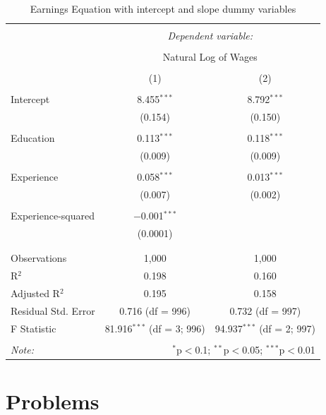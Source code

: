 \documentclass[
]{book}
\theoremstyle{definition}
\theoremstyle{definition}
\theoremstyle{definition}
\theoremstyle{definition}
\theoremstyle{remark}
\begin{document}
\begin{table}[!htbp] \centering 
  \caption{Earnings Equation  with intercept and slope dummy variables} 
  \label{} 
\begin{tabular}{@{\extracolsep{5pt}}lcc} 
\\[-1.8ex]\hline 
\hline \\[-1.8ex] 
 & \multicolumn{2}{c}{\textit{Dependent variable:}} \\ 
\cline{2-3} 
\\[-1.8ex] & \multicolumn{2}{c}{Natural Log of Wages} \\ 
\\[-1.8ex] & (1) & (2)\\ 
\hline \\[-1.8ex] 
 Intercept & 8.455$^{***}$ & 8.792$^{***}$ \\ 
  & (0.154) & (0.150) \\ 
  & & \\ 
 Education & 0.113$^{***}$ & 0.118$^{***}$ \\ 
  & (0.009) & (0.009) \\ 
  & & \\ 
 Experience & 0.058$^{***}$ & 0.013$^{***}$ \\ 
  & (0.007) & (0.002) \\ 
  & & \\ 
 Experience-squared & $-$0.001$^{***}$ &  \\ 
  & (0.0001) &  \\ 
  & & \\ 
\hline \\[-1.8ex] 
Observations & 1,000 & 1,000 \\ 
R$^{2}$ & 0.198 & 0.160 \\ 
Adjusted R$^{2}$ & 0.195 & 0.158 \\ 
Residual Std. Error & 0.716 (df = 996) & 0.732 (df = 997) \\ 
F Statistic & 81.916$^{***}$ (df = 3; 996) & 94.937$^{***}$ (df = 2; 997) \\ 
\hline 
\hline \\[-1.8ex] 
\textit{Note:}  & \multicolumn{2}{r}{$^{*}$p$<$0.1; $^{**}$p$<$0.05; $^{***}$p$<$0.01} \\ 
\end{tabular} 
\end{table}

\hypertarget{problems-4}{%
\section*{Problems}\label{problems-4}}
\end{document}
